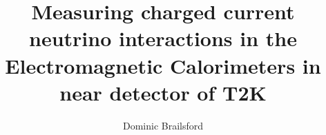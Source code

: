 \documentclass[hyperpdf,bindnopdf]{hepthesis}
\title{Measuring charged current neutrino interactions in the Electromagnetic Calorimeters in near detector of T2K}
\author{Dominic Brailsford}
\begin{document}
\begin{frontmatter}
  
\end{frontmatter}

\begin{mainmatter}

\setcounter{secnumdepth}{3}

  
  

\end{mainmatter}

%  

\begin{backmatter}
  
\end{backmatter}

\end{document}
